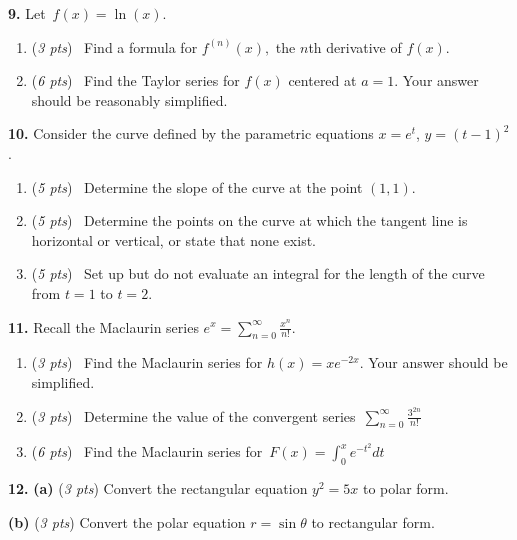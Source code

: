 \documentclass[12pt]{article}
\let\ds\displaystyle
\newcommand{\prob}[1]{\bigskip\noindent\textbf{#1.} }
\newcommand{\pts}[1]{{\small (\textsl{#1})}}
\newcommand{\ppartpts}[2]{\textbf{(#1)} \pts{#2 pts} \quad}
\newcommand{\epartpts}[2]{\medskip\noindent \textbf{(#1)} \pts{#2 pts} \quad}
\begin{document}
\newpage
\prob{9} Let \,{\large $f(x)=\ln(x)$}. 
	\begin{enumerate}[leftmargin=7mm]
	\item \pts{3 pts} \, Find a formula for $f^{(n)}(x),$ the $n$th derivative of $f(x).$
	\vspace{3.0in}
	\item \pts{6 pts} \, Find the Taylor series for $f(x)$ centered at $a=1.$ Your answer should be reasonably simplified.
	\vfill
	\end{enumerate}

\newpage
\prob{10} Consider the curve defined by the parametric equations \hspace{.2in} {\large $x=e^t$, \hspace{.1in} $y=(t-1)^2$}.
	\begin{enumerate}[leftmargin=7mm]
	\item \pts{5 pts} \,  Determine the slope of the curve at the point $(1,1).$
	\vfill
	\item \pts{5 pts} \,  Determine the points on the curve at which the tangent line is horizontal or vertical, or state that none exist.
	\vfill
	\item \pts{5 pts} \,  Set up but do not evaluate an integral for the length of the curve from $t=1$ to $t=2.$
	\vfill
	\end{enumerate}  

\newpage
\prob{11} Recall the Maclaurin series $\displaystyle e^x = \sum_{n=0}^\infty \frac{x^n}{n!}.$
	\begin{enumerate}[leftmargin=7mm]
	\item \pts{3 pts} \,  Find the Maclaurin series for $\ds h(x)=xe^{-2x}.$  Your answer should be simplified.\\
	\vspace{1in}
	\item \pts{3 pts} \,  Determine the value of the convergent series \,$\ds \sum_{n=0}^\infty \frac{3^{2n}}{n!}$
	\vspace{1in}
	\item \pts{6 pts} \,  Find the Maclaurin series for \,$\ds F(x)=\int_0^x e^{-t^2} dt$
	\vfill
	\end{enumerate}

\newpage
\prob{12}  \ppartpts{a}{3} Convert the rectangular equation $y^2=5x$ to polar form.
\vspace{1.5in}

\epartpts{b}{3} Convert the polar equation $r=\sin \theta$ to rectangular form.
\vspace{1.5in}
\end{document}
